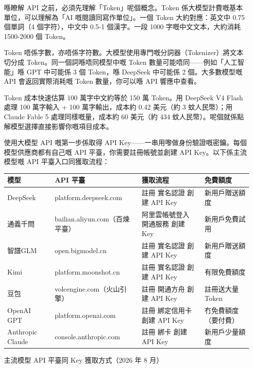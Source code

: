 
喺瞭解 API 之前，必須先理解「Token」呢個概念。Token 係大模型計費嘅基本單位，可以理解為「AI 嘅閱讀同寫作單位」。一個 Token 大約對應：英文中 0.75 個單詞（4 個字符），中文中 0.5-1 個漢字。一段 1000 字嘅中文文本，大約消耗 1500-2000 個 Token。

Token 唔係字數，亦唔係字符數。大模型使用專門嘅分詞器（Tokenizer）將文本切分成 Token。同一個詞喺唔同模型中嘅 Token 數量可能唔同——例如「人工智能」喺 GPT 中可能係 3 個 Token，喺 DeepSeek 中可能係 2 個。大多數模型嘅 API 會返回實際消耗嘅 Token 數量，你可以喺 API 響應中查看。

\begin{tcbinfo}{Token 成本快速估算}
100 萬字中文約等於 150 萬 Token。用 DeepSeek V4 Flash 處理 100 萬字輸入 + 100 萬字輸出，成本約 0.42 美元（約 3 蚊人民幣）；用 Claude Fable 5 處理同樣嘅量，成本約 60 美元（約 434 蚊人民幣）。呢個就係點解模型選擇直接影響你嘅項目成本。

\end{tcbinfo}


使用大模型 API 嘅第一步係取得 API Key——一串用嚟做身份驗證嘅密鑰。每個模型供應商都有自己嘅 API 平臺，你需要註冊帳號並創建 API Key。以下係主流模型嘅 API 平臺入口同獲取流程：

\begin{center}
\begin{tabularx}{\linewidth}{|X|X|X|X|}
\hline
\textbf{模型} & \textbf{API 平臺} & \textbf{獲取流程} & \textbf{免費額度} \tabularnewline
\hline
DeepSeek & platform.deepseek.com & 註冊 實名認證 創建 API Key & 新用戶贈送額度 \tabularnewline
通義千問 & bailian.aliyun.com（百煉平臺） & 阿里雲帳號登入 開通服務 創建 Key & 新用戶免費試用 \tabularnewline
智譜GLM & open.bigmodel.cn & 註冊 實名認證 創建 API Key & 新用戶贈送額度 \tabularnewline
Kimi & platform.moonshot.cn & 註冊 實名認證 創建 API Key & 有限免費額度 \tabularnewline
豆包 & volcengine.com（火山引擎） & 註冊 開通方舟 創建 API Key & 註冊送大量 Token \tabularnewline
OpenAI GPT & platform.openai.com & 註冊 綁定信用卡 創建 API Key & 冇免費額度（要付費） \tabularnewline
Anthropic Claude & console.anthropic.com & 註冊 綁卡 創建 API Key & 新用戶少量額度 \tabularnewline
\hline
\end{tabularx}
\end{center}

\begin{center}\small\color{gray}主流模型 API 平臺同 Key 獲取方式（2026 年 8 月）\end{center}


